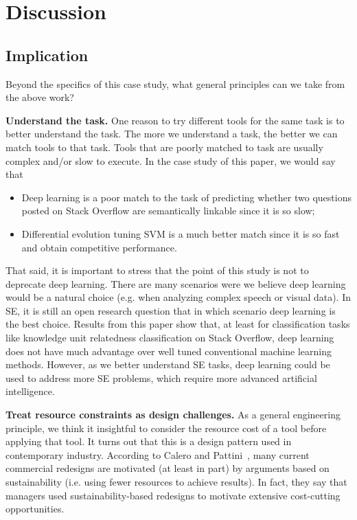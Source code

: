\documentclass[sigconf]{acmart}
\theoremstyle{break}
\newcommand{\bi}{\begin{itemize}[leftmargin=0.4cm]}
\newcommand{\ei}{\end{itemize}}
\begin{document}
\section{Discussion}\label{discussion}
 
\subsection{Implication}

Beyond the specifics of this case study, what general principles
can we take from the above work?

\textbf{Understand the task.}
One reason to try different tools for the same task is to better
understand the task.
The more we understand a task, the better we can match tools to that task. Tools that are poorly matched to task are usually complex and/or slow to execute.  In the case study of this paper, we would say that

\bi
\item
Deep learning is a poor match to the task of predicting whether two questions posted on Stack Overflow are semantically linkable
since it is so slow;
\item
Differential evolution tuning SVM is a much better match since it is so fast and obtain competitive performance.
\ei
That said, 
it  is important to stress that the point of this study
is not to deprecate deep learning.  
There are many scenarios were we
 believe  deep learning would be a natural
 choice (e.g. when analyzing complex speech or visual data). 
 In SE, it is still an open research question that in which scenario deep learning
 is the best choice. Results from this paper show that, at least for classification tasks like 
 knowledge unit relatedness classification on Stack Overflow,
 deep learning does not have much advantage over well tuned conventional machine learning methods. 
However, as we better understand SE tasks, deep learning could be used to address more SE problems,
which require more advanced artificial intelligence. 





\textbf{Treat resource constraints as design challenges.}
As a general engineering principle,
we think it insightful to consider the resource cost
of a tool before applying that tool.
It turns out that this is a design pattern used in contemporary industry.
According to Calero and Pattini~\cite{calero2015green},  many current commercial  redesigns are motivated (at least in part) by arguments based on sustainability (i.e. using fewer resources to achieve results).
In fact, they say that managers used sustainability-based redesigns to 
motivate extensive cost-cutting opportunities. 
\end{document}
